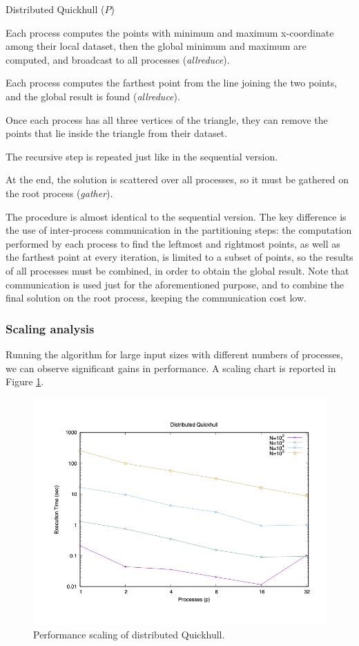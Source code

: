 \documentclass[]{finalproject}
\begin{document}
\begin{algorithm}
  \caption{Distributed Quickhull ($P$)}
  \label{alg:qh3}
  Each process computes the points with minimum and maximum x-coordinate among their local dataset, then the global minimum and maximum are computed, and broadcast to all processes (\textit{allreduce}).

  Each process computes the farthest point from the line joining the two points, and the global result is found (\textit{allreduce}).

  Once each process has all three vertices of the triangle, they can remove the points that lie inside the triangle from their dataset.

  The recursive step is repeated just like in the sequential version.

  At the end, the solution is scattered over all processes, so it must be gathered on the root process (\textit{gather}).
\end{algorithm}

The procedure is almost identical to the sequential version.
The key difference is the use of inter-process communication in the partitioning steps:
the computation performed by each process to find the leftmost and rightmost points, as well as the farthest point at every iteration,
is limited to a subset of points, so the results of all processes must be combined, in order to obtain the global result.
Note that communication is used just for the aforementioned purpose, and to combine the final solution on the root process,
keeping the communication cost low.

\subsubsection{Scaling analysis}
Running the algorithm for large input sizes with different numbers of processes, we can observe significant gains in performance.
A scaling chart is reported in Figure \ref{fig:qh-scaling}.
\begin{figure}[H]
\centering
\includegraphics[width=0.5\linewidth]{gpStrongTime.png}
\caption{Performance scaling of distributed Quickhull.}
\label{fig:qh-scaling}
\end{figure}
\end{document}
